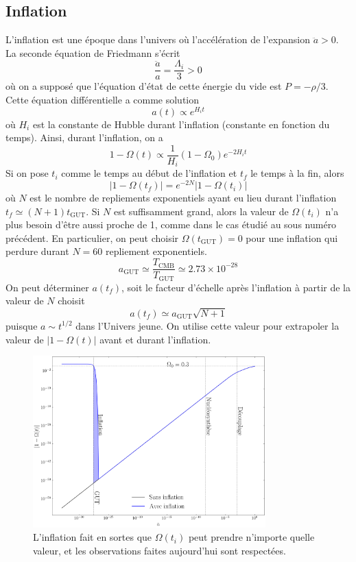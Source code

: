 \documentclass{article}
\numberwithin{equation}{section}
\begin{document}
\subsection{Inflation}
L'inflation est une époque dans l'univers où l'accélération de l'expansion $\ddot{a} > 0$. 
La seconde équation de Friedmann s'écrit
\[
        \frac{\ddot{a}}{a} = \frac{\Lambda_i}{3} > 0 
\]
où on a supposé que l'équation d'état de cette énergie du vide est $P = -\rho/3$. Cette équation 
différentielle a comme solution
\[
        a(t) \propto e^{H_i t}
\]
où $H_i$ est la constante de Hubble durant l'inflation (constante en fonction du temps). Ainsi, 
durant l'inflation, on a
\[
        1 - \Omega(t) \propto \frac{1}{H_i}(1 - \Omega_0)e^{-2H_i t}
\]
Si on pose $t_i$ comme le temps au début de l'inflation et $t_f$ le temps à la fin, alors
\[
        |1 - \Omega(t_f)| = e^{-2N}|1 - \Omega(t_i)|
\]
où $N$ est le nombre de repliements exponentiels ayant eu lieu durant l'inflation $t_f \simeq (N + 1)t_{\mathrm{GUT}}$.
Si 
$N$ est suffisamment grand, alors la valeur de $\Omega(t_i)$ n'a plus besoin d'être aussi 
proche de 1, comme dans le cas étudié au sous numéro précédent. En particulier, 
on peut choisir $\Omega(t_{\mathrm{GUT}}) = 0$ pour une inflation qui perdure durant $N=60$ repliement 
exponentiels. 
\[
        a_{\mathrm{GUT}} \simeq \frac{T_{\mathrm{CMB}}}{T_{\mathrm{GUT}}} \simeq 2.73\times 10^{-28}
\]
On peut déterminer $a(t_f)$, soit le facteur d'échelle après l'inflation à partir de la valeur de $N$ 
choisit
\[
        \boxed{a(t_f) \simeq a_{\mathrm{GUT}}\sqrt{N + 1}}
\]
puisque $a \sim t^{1/2}$ dans l'Univers jeune. On utilise cette valeur pour extrapoler la valeur de 
$|1 - \Omega(t)|$ avant et durant l'inflation.
\begin{figure}[H]
        \centering
        \includegraphics[width=0.8\textwidth]{omega_inflation}
        \caption{L'inflation fait en sortes que $\Omega(t_i)$ peut prendre n'importe quelle valeur, et 
        les observations faites aujourd'hui sont respectées.}
\end{figure}
\end{document}
